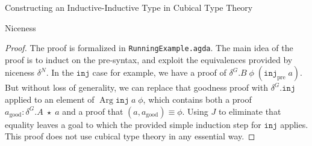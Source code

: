 \documentclass[runningheads]{llncs}
\newcommand{\erase}[1]{{}}
\DeclareMathOperator{\USet}{Type}
\DeclareMathOperator{\Arg}{Arg}
\newcommand{\pre}[1]{{#1}_\text{pre}}
\newcommand{\good}[1]{{#1}_\text{good}}
\newcommand{\Id}[2]{{#1}\equiv{#2}}
\newcommand{\IdA}[3]{{#1}\equiv_{#3}{#2}}
\newcommand{\join}{\texttt{ext}}
\newcommand{\inj}{\texttt{inj}}
\newcommand{\PA}{\mathit{PA}}
\newcommand{\PB}{\mathit{PB}}
\newcommand{\EA}{\mathit{EA}}
\newcommand{\EB}{\mathit{EB}}
\begin{document}
\begin{section}{Constructing an Inductive-Inductive Type in Cubical Type Theory}
\begin{subsection}{Niceness}
\begin{proof}
The proof is formalized in \texttt{RunningExample.agda}. The main idea of the proof is to induct on the pre-syntax, and exploit the equivalences provided by niceness $\delta^N$. In the $\inj$ case for example, we have a proof of $\delta^G.B\;\phi\;(\pre{\inj}\;a)$. But without loss of generality, we can replace that goodness proof with $\delta^G.\inj$ applied to an element of $\Arg\inj\;a\;\phi$, which contains both a proof $\good{a} : \delta^G.A\;\star\;a$ and a proof that $\Id{(a, \good{a})}{\phi}$. Using $J$ to eliminate that equality leaves a goal to which the provided simple induction step for $\inj$ applies. This proof does not use cubical type theory in any essential way.

\erase{
Assume motives $(\PA, \PB)$ and methods $(P\eta, P\join, P\inj)$
\begin{align*}
\PA :&\; A \to \USet,\\
\PB :&\; (a : A) \to B\;a\to \USet,\\
P\eta :&\; (x : X) \to \PA\;(\eta\;x),\\
P\join :&\; (a : A) \to \PA\;a\to (b : B\;a) \to \PB\;a\;b \to \PA\;(\join\;a\;b),\\
P\inj :&\; (a : A) \to \PA\;a\to \PB\;a\;(\inj\;a).
\end{align*}
We need to produce eliminators $(\EA, \EB)$ satisfying equalities $(E\eta, E\join, E\inj)$.
\begin{align*}
\EA :&\; (a : A) \to \PA\;a,\\
\EB :&\; (a : A) \to (b : B\;a) \to \PB\;a\;b,\\
E\eta :&\; (x : X) \to \IdA{\EA\;(\eta\;x)}{P\eta\;x}{\PA\;(\eta\;x)},\\
E\join :&\; (a : A) \to (b : B\;a) \to \IdA{\EA\;(\join\;a\;b)}{P\join\;a\;(\EA\;a)\;b\;(\EB\;a\;b)}{\PA\;(\join\;a\;b)},\\
E\inj :&\; (a : A) \to \IdA{\EB\;a\;(\inj\;a)}{P\inj\;a\;(\EA\;a)}{\PB\;a\;(\inj\;a)}.
\end{align*}
Keep in mind the definitions in Figure \ref{example-goodness-algebra-def}.
Since we have defined \[A = (a : \pre{A}) \times \delta^G.A\;\star\;a,\qquad B\;\phi = (b : \pre{B})\times\delta^G\;\phi\;b,\] up to currying it is sufficient to define \[\EA : (\pre{a} : \pre{A}) \to (\good{a} : \delta^G.A\;\star\;\pre{a}) \to \PA\;(\pre{a}, \good{a}),\]\[\EB : (\pre{b} : \pre{B}) \to (\phi : A) \to (\good{b} : \delta^G.B\;\phi\;(\pre{b}, \good{b})) \to \PB\;\phi\;(\pre{b}, \good{b}),\] and we will do so by induction on the pre-syntax.
\begin{itemize}

\end{itemize}}
\end{proof}
\end{subsection}
\end{section}
\end{document}
